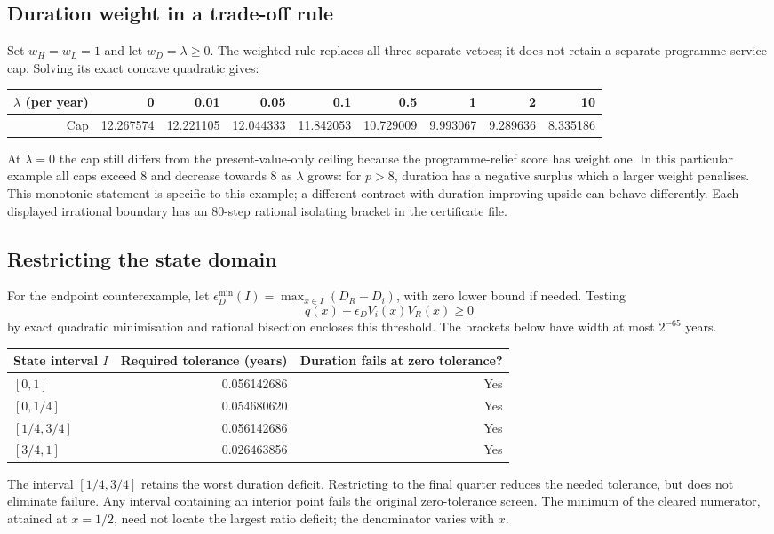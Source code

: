 \documentclass[11pt,a4paper]{article}
\begin{document}
\subsection{Duration weight in a trade-off rule}
Set $w_H=w_L=1$ and let $w_D=\lambda\geq0$. The weighted rule replaces all three separate vetoes; it does not retain a separate programme-service cap. Solving its exact concave quadratic gives:
\begin{center}\small
\setlength{\tabcolsep}{3pt}\begin{tabular}{rrrrrrrrr}\toprule
$\lambda$ (per year)&0&0.01&0.05&0.1&0.5&1&2&10\\\midrule
Cap&12.267574&12.221105&12.044333&11.842053&10.729009&9.993067&9.289636&8.335186\\\bottomrule
\end{tabular}\normalsize
\end{center}
At $\lambda=0$ the cap still differs from the present-value-only ceiling because the programme-relief score has weight one. In this particular example all caps exceed 8 and decrease towards 8 as $\lambda$ grows: for $p>8$, duration has a negative surplus which a larger weight penalises. This monotonic statement is specific to this example; a different contract with duration-improving upside can behave differently. Each displayed irrational boundary has an 80-step rational isolating bracket in the certificate file.

\subsection{Restricting the state domain}
For the endpoint counterexample, let $\epsilon_D^{\min}(I)=\max_{x\in I}(D_R-D_i)$, with zero lower bound if needed. Testing
\[
q(x)+\epsilon_D V_i(x)V_R(x)\geq0
\]
by exact quadratic minimisation and rational bisection encloses this threshold. The brackets below have width at most $2^{-65}$ years.
\begin{center}
\begin{tabular}{lrr}\toprule
State interval $I$ & Required tolerance (years) & Duration fails at zero tolerance?\\\midrule
$[0,1]$ &0.056142686&Yes\\
$[0,1/4]$&0.054680620&Yes\\
$[1/4,3/4]$&0.056142686&Yes\\
$[3/4,1]$&0.026463856&Yes\\\bottomrule
\end{tabular}
\end{center}
The interval $[1/4,3/4]$ retains the worst duration deficit. Restricting to the final quarter reduces the needed tolerance, but does not eliminate failure. Any interval containing an interior point fails the original zero-tolerance screen. The minimum of the cleared numerator, attained at $x=1/2$, need not locate the largest ratio deficit; the denominator varies with $x$.
\end{document}
